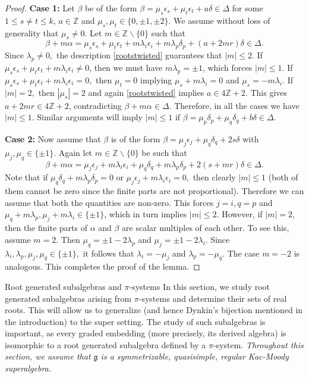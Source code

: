 \documentclass[11pt,reqno]{amsart}
\makeatletter
\theoremstyle{plain}
\theoremstyle{definition}
\theoremstyle{remark}
\newcommand{\lie}[1]{\mathfrak{#1}}
\newcommand\bz{\mathbb Z}
\numberwithin{equation}{section}
\def\section{\def\@secnumfont{\mdseries}\@startsection{section}{1}%
  \z@{.7\linespacing\@plus\linespacing}{.5\linespacing}%
  {\normalfont\scshape\centering}}
\makeatother
\begin{document}
\begin{proof}
\textbf{Case 1:} Let $\beta$ be of the form $\beta=\mu_s\epsilon_s+\mu_t\epsilon_t+a\delta\in \Delta$ for some $1\le s\neq t\le k$, $a\in \bz$ and $\mu_s,\mu_t\in \{0,\pm 1,\pm 2\}.$ We assume without loss of generality that $\mu_s\neq 0.$ Let $m\in \bz\backslash\{0\}$ such that
$$\beta+m\alpha=\mu_s\epsilon_s+\mu_t\epsilon_t+m\lambda_i\epsilon_i+m\lambda_p\delta_p+(a+2mr)\delta\in \Delta.$$
Since $\lambda_p\neq 0,$ the description \eqref{rootstwisted} guarantees that $|m|\le 2.$ If $\mu_s\epsilon_s+\mu_t\epsilon_t+m\lambda_i\epsilon_i\neq 0$, then we must have $m\lambda_p=\pm 1$, which forces $|m|\le 1.$ If $\mu_s\epsilon_s+\mu_t\epsilon_t+m\lambda_i\epsilon_i= 0,$ then $\mu_t=0$ implying $\mu_s+m\lambda_i=0$ and $\mu_s=-m\lambda_i.$ If $|m|=2,$ then $|\mu_s|=2$ and again \eqref{rootstwisted} implies $a\in 4\bz+2.$ This gives $a + 2mr \in 4\mathbb{Z}+2$, contradicting $\beta+m\alpha \in \Delta$.
Therefore, in all the cases we have $|m|\le 1.$ Similar arguments will imply $|m|\le 1$ if $\beta=\mu_p\delta_p+\mu_q\delta_q+b\delta\in \Delta$.

\textbf{Case 2:} Now assume that $\beta$ is of the form $\beta=\mu_j\epsilon_j+\mu_q\delta_q+2s\delta$ with $\mu_j,\mu_q\in\{\pm 1\}$. Again let $m\in\bz\backslash\{0\}$ be such that
$$\beta+m\alpha=\mu_j\epsilon_j+m\lambda_i\epsilon_i+\mu_q\delta_q+m\lambda_p\delta_p+2(s+mr)\delta\in \Delta.$$
Note that if $\mu_q\delta_q+m\lambda_p\delta_p=0$ or $\mu_j\epsilon_j+m\lambda_i\epsilon_i=0,$ then clearly $|m|\le 1$ (both of them cannot be zero since the finite parts are not proportional). Therefore we can assume that both the quantities are non-zero. This forces $j=i,q=p$ and $\mu_q+m\lambda_p,\mu_j+m\lambda_i\in \{\pm 1\}$, which in turn implies $|m|\le 2.$  However, if $|m|=2$, then the finite parts of $\alpha$ and $\beta$ are scalar multiples of each other. To see this, assume $m=2$. Then $\mu_q=\pm 1 -2\lambda_p$ and $\mu_j=\pm 1-2\lambda_i.$ Since $\lambda_i,\lambda_p,\mu_j,\mu_q\in \{\pm 1\},$ it follows that $\lambda_i=-\mu_j$ and $\lambda_p=-\mu_q$. The case $m = -2$ is analogous. This completes the proof of the lemma.
\end{proof}
\section{Root generated subalgebras and \texorpdfstring{$\pi$}{pi}-systems}\label{secrgs}
In this section, we study root generated subalgebras arising from $\pi$-systems and determine their sets of real roots. This will allow us to generalize \cite[Theorem~1]{idv2023root} (and hence Dynkin’s bijection mentioned in the introduction) to the super setting. The study of such subalgebras is important, as every graded embedding (more precisely, its derived algebra) is isomorphic to a root generated subalgebra defined by a $\pi$-system.
\textit{Throughout this section, we assume that $\lie g$ is a symmetrizable, quasisimple, regular Kac-Moody superalgebra.} 
\end{document}
